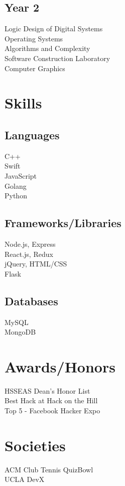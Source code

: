 \documentclass[]{deedy-resume-openfont}
\begin{document}
\begin{minipage}[t]{0.33\textwidth}
\subsection{Year 2}
Logic Design of Digital Systems \\
Operating Systems \\
Algorithms and Complexity \\
Software Construction Laboratory \\
Computer Graphics \\
\sectionsep


\section{Skills}
\subsection{Languages}
\textbullet{} C++  \\
\textbullet{} Swift \\ 
\textbullet{} JavaScript \\ 
\textbullet{} Golang \\ 
\textbullet{} Python \\
\sectionsep
\subsection{Frameworks/Libraries}
\textbullet{} Node.js, Express  \\
\textbullet{} React.js, Redux \\ 
\textbullet{} jQuery, HTML/CSS \\ 
\textbullet{} Flask \\
\sectionsep
\subsection{Databases} 
\textbullet{} MySQL \\
\textbullet{} MongoDB


\sectionsep

\section{Awards/Honors}
\textbullet{} HSSEAS Dean's Honor List \\ 
\textbullet{} Best Hack at Hack on the Hill\\
\textbullet{} Top 5 - Facebook Hacker Expo\\

\sectionsep

\section{Societies}
ACM \textbullet{} Club Tennis \textbullet{} QuizBowl \textbullet{} \\ UCLA DevX

%
%

\end{minipage} 
\end{document}
